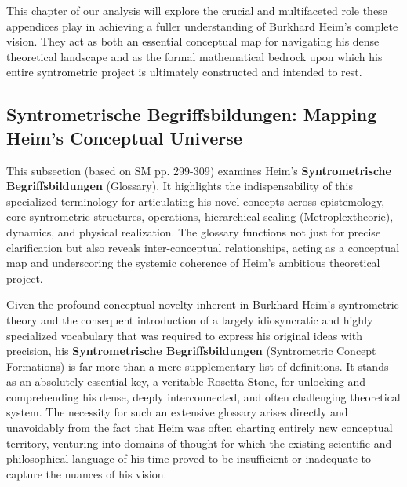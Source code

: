 \documentclass[12pt]{article}
\begin{document}
This chapter of our analysis will explore the crucial and multifaceted role these appendices play in achieving a fuller understanding of Burkhard Heim's complete vision. They act as both an essential conceptual map for navigating his dense theoretical landscape and as the formal mathematical bedrock upon which his entire syntrometric project is ultimately constructed and intended to rest.

\subsection{Syntrometrische Begriffsbildungen: Mapping Heim's Conceptual Universe}
\label{sec:begriffsbildungen}

This subsection (based on SM pp. 299-309) examines Heim's \textbf{Syntrometrische Begriffsbildungen} (Glossary). It highlights the indispensability of this specialized terminology for articulating his novel concepts across epistemology, core syntrometric structures, operations, hierarchical scaling (Metroplextheorie), dynamics, and physical realization. The glossary functions not just for precise clarification but also reveals inter-conceptual relationships, acting as a conceptual map and underscoring the systemic coherence of Heim's ambitious theoretical project.

Given the profound conceptual novelty inherent in Burkhard Heim’s syntrometric theory and the consequent introduction of a largely idiosyncratic and highly specialized vocabulary that was required to express his original ideas with precision, his \textbf{Syntrometrische Begriffsbildungen} (Syntrometric Concept Formations) is far more than a mere supplementary list of definitions. It stands as an absolutely essential key, a veritable Rosetta Stone, for unlocking and comprehending his dense, deeply interconnected, and often challenging theoretical system. The necessity for such an extensive glossary arises directly and unavoidably from the fact that Heim was often charting entirely new conceptual territory, venturing into domains of thought for which the existing scientific and philosophical language of his time proved to be insufficient or inadequate to capture the nuances of his vision.
\end{document}

